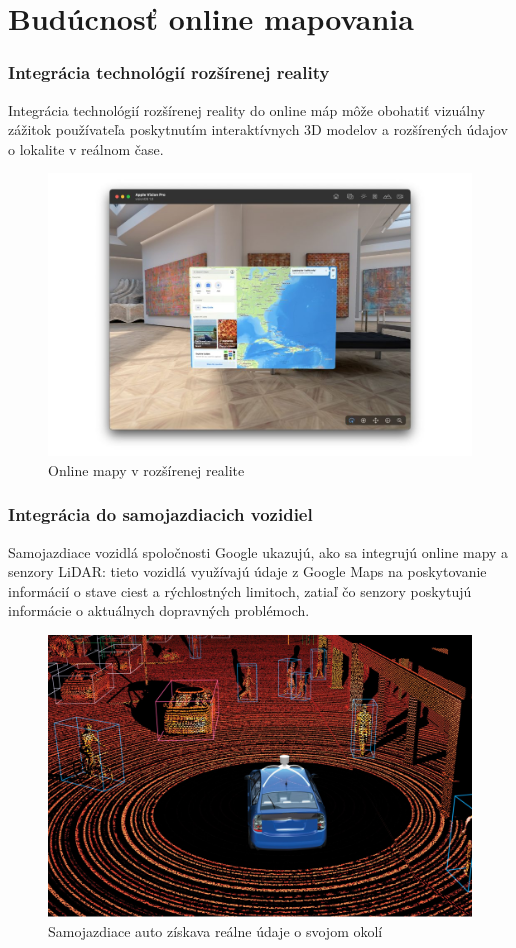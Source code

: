 \documentclass{beamer}
\begin{document}
\section{Budúcnosť online mapovania}

\begin{frame}[fragile=singleslide]\frametitle{Integrácia technológií rozšírenej reality}
Integrácia technológií rozšírenej reality do online máp môže obohatiť vizuálny zážitok používateľa poskytnutím interaktívnych 3D modelov a rozšírených údajov o lokalite v reálnom čase.
\begin{figure}[h]
	\centering
	\includegraphics[scale=0.2]{diagram7.jpg}
	\caption{Online mapy v rozšírenej realite}
	\label{fig:ar}
\end{figure}
\end{frame}

\begin{frame}[fragile=singleslide]\frametitle{Integrácia do samojazdiacich vozidiel}
Samojazdiace vozidlá spoločnosti Google ukazujú, ako sa integrujú online mapy a senzory LiDAR: tieto vozidlá využívajú údaje z Google Maps na poskytovanie informácií o stave ciest a rýchlostných limitoch, zatiaľ čo senzory poskytujú informácie o aktuálnych dopravných problémoch. 
\begin{figure}[h]
	\centering
	\includegraphics[scale=0.08]{image4.jpg}
	\caption{Samojazdiace auto získava reálne údaje o svojom okolí}
	\label{fig:car}
\end{figure}
\end{frame}
\end{document}

